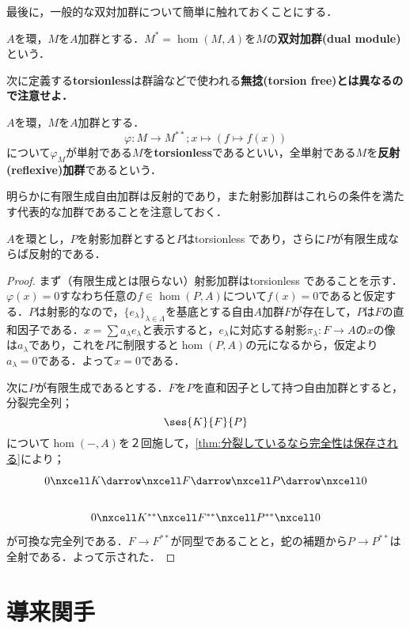 最後に，一般的な双対加群について簡単に触れておくことにする．

\begin{defi}[双対加群]
	$A$を環，$M$を$A$加群とする．$M^\ast=\hom(M,A)$を$M$の\textbf{双対加群(dual module)}という．
\end{defi}

次に定義する\textbf{torsionless}は群論などで使われる\textbf{無捻(torsion free)とは異なるので注意せよ．}
\begin{defi}
	$A$を環，$M$を$A$加群とする．
	\[\varphi:M\to M^{\ast\ast};x\mapsto(f\mapsto f(x))\]
	について$\varphi_M$が単射である$M$を\textbf{torsionless}であるといい，全単射である$M$を\textbf{反射(reflexive)加群}であるという．
\end{defi}
明らかに有限生成自由加群は反射的であり，また射影加群はこれらの条件を満たす代表的な加群であることを注意しておく．

\begin{prop}\label{prop:射影加群はtorsionless}
	$A$を環とし，$P$を射影加群とすると$P$はtorsionless であり，さらに$P$が有限生成ならば反射的である．
\end{prop}

\begin{proof}
	まず（有限生成とは限らない）射影加群はtorsionless であることを示す．$\varphi(x)=0$すなわち任意の$f\in\hom(P,A)$について$f(x)=0$であると仮定する．$P$は射影的なので，$\{e_\lambda\}_{\lambda\in\Lambda}$を基底とする自由$A$加群$F$が存在して，$P$は$F$の直和因子である．$x=\sum a_\lambda e_\lambda$と表示すると，$e_\lambda$に対応する射影$\pi_\lambda:F\to A$の$x$の像は$a_\lambda$であり，これを$P$に制限すると$\hom(P,A)$の元になるから，仮定より$a_\lambda=0$である．よって$x=0$である．
	
	次に$P$が有限生成であるとする．$F$を$P$を直和因子として持つ自由加群とすると，分裂完全列；
	\[\ses{K}{F}{P}\]
	について$\hom(-,A)$を２回施して，\ref{thm:分裂しているなら完全性は保存される}により；
	\[\begin{tikzcd}
		0\nxcell K\darrow\nxcell F\darrow\nxcell P\darrow\nxcell0\\
		0\nxcell K^{\ast\ast}\nxcell F^{\ast\ast}\nxcell P^{\ast\ast}\nxcell0
	\end{tikzcd}\]
	が可換な完全列である．$F\to F^{\ast\ast}$が同型であることと，蛇の補題から$P\to P^{\ast\ast}$は全射である．よって示された．
\end{proof}
\section{導来関手}

